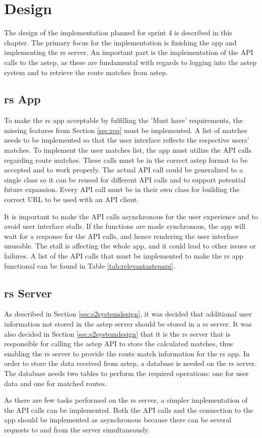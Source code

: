 \section{Design}
The design of the implementation planned for sprint 4 is described in this chapter.
The primary focus for the implementation is finishing the app and implementing the \gls{rs} server.
An important part is the implementation of the API calls to the \gls{astep}, as these are fundamental with regards to logging into the \gls{astep} system and to retrieve the route matches from \gls{astep}.

\subsection{\gls{rs} App}
To make the \gls{rs} app acceptable by fulfilling the 'Must have' requirements, the missing features from Section \ref{sec:req} must be implemented.
A list of matches needs to be implemented so that the user interface reflects the respective users' matches.
To implement the user matches list, the app must utilize the API calls regarding route matches.
These calls must be in the correct \gls{astep} format to be accepted and to work properly.
The actual API call could be generalized to a single class so it can be reused for different API calls and to support potential future expansion.
Every API call must be in their own class for building the correct URL to be used with an API client.

It is important to make the API calls asynchronous for the user experience and to avoid user interface stalls. 
If the functions are made synchronous, the app will wait for a response for the API calls, and hence rendering the user interface unusable.
The stall is affecting the whole app, and it could lead to other issues or failures.
A list of the API calls that must be implemented to make the \gls{rs} app functional can be found in Table \ref{tab:relevantastepapi}.

\subsection{\gls{rs} Server}
As described in Section \ref{sec:s2systemdesign}, it was decided that additional user information not stored in the \gls{astep} server should be stored in a \gls{rs} server.
It was also decided in Section \ref{sec:s2systemdesign} that it is the \gls{rs} server that is responsible for calling the \gls{astep} API to store the calculated matches, thus enabling the \gls{rs} server to provide the route match information for the \gls{rs} app.
In order to store the data received from \gls{astep}, a database is needed on the \gls{rs} server.
The database needs two tables to perform the required operations: one for user data and one for matched routes.

As there are few tasks performed on the \gls{rs} server, a simpler implementation of the API calls can be implemented.
Both the API calls and the connection to the app should be implemented as asynchronous because there can be several requests to and from the server simultaneously. 
